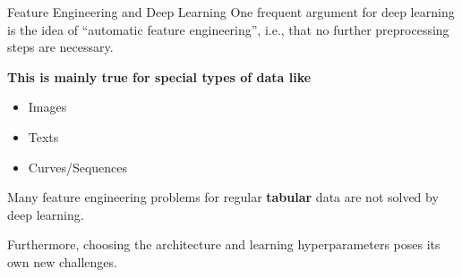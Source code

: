 \begin{vbframe}{Feature Engineering and Deep Learning}
    One frequent argument for deep learning is the idea of \enquote{automatic feature engineering}, i.e., that no further preprocessing steps are necessary.
    \medskip
    
    \textbf{This is mainly true for special types of data like}
    
    \begin{itemize}
        \item Images
        \item Texts
        \item Curves/Sequences
    \end{itemize}
    Many feature engineering problems for regular \textbf{tabular} data are not solved by deep learning.
    \medskip
    
    Furthermore, choosing the architecture and learning hyperparameters poses its own new challenges.
\end{vbframe}


\endlecture


